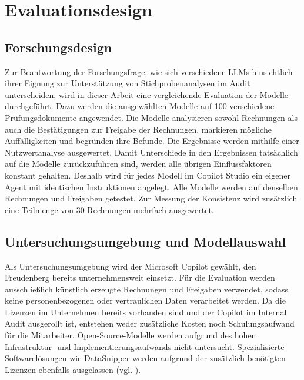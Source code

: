 \chapter{Evaluationsdesign}
\label{chap:evaluationsdesign}

\section{Forschungsdesign}
\label{sec:forschungsdesign}

Zur Beantwortung der Forschungsfrage, wie sich verschiedene \acp{LLM} hinsichtlich ihrer Eignung zur Unterstützung von Stichprobenanalysen im Audit unterscheiden, wird in dieser Arbeit eine vergleichende Evaluation der Modelle durchgeführt. Dazu werden die ausgewählten Modelle auf 100 verschiedene Prüfungsdokumente angewendet. Die Modelle analysieren sowohl Rechnungen als auch die Bestätigungen zur Freigabe der Rechnungen, markieren mögliche Auffälligkeiten und begründen ihre Befunde. Die Ergebnisse werden mithilfe einer Nutzwertanalyse ausgewertet. Damit Unterschiede in den Ergebnissen tatsächlich auf die Modelle zurückzuführen sind, werden alle übrigen Einflussfaktoren konstant gehalten. Deshalb wird für jedes Modell im Copilot Studio ein eigener Agent mit identischen Instruktionen angelegt. Alle Modelle werden auf denselben Rechnungen und Freigaben getestet. Zur Messung der Konsistenz wird zusätzlich eine Teilmenge von 30 Rechnungen mehrfach ausgewertet.

\section{Untersuchungsumgebung und Modellauswahl}
\label{sec:untersuchungsumgebung}
\label{sec:modellauswahl}

Als Untersuchungsumgebung wird der Microsoft Copilot gewählt, den Freudenberg bereits unternehmensweit einsetzt. Für die Evaluation werden ausschließlich künstlich erzeugte Rechnungen und Freigaben verwendet, sodass keine personenbezogenen oder vertraulichen Daten verarbeitet werden. Da die Lizenzen im Unternehmen bereits vorhanden sind und der Copilot im Internal Audit ausgerollt ist, entstehen weder zusätzliche Kosten noch Schulungsaufwand für die Mitarbeiter. Open-Source-Modelle werden aufgrund des hohen Infrastruktur- und Implementierungsaufwands nicht untersucht. Spezialisierte Softwarelösungen wie DataSnipper werden aufgrund der zusätzlich benötigten Lizenzen ebenfalls ausgelassen (vgl. \cite{DataSnipperPricing2026}).

